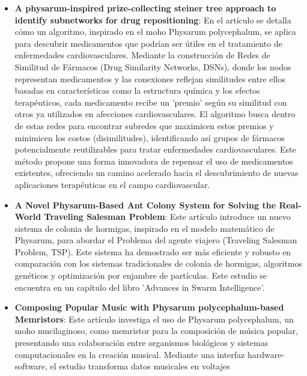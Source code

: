     \begin{itemize}
        \item \textbf{A physarum-inspired prize-collecting steiner tree approach to identify subnetworks for drug repositioning}:
            En el art\'iculo se detalla c\'omo un algoritmo, inspirado en el moho Physarum polycephalum, se aplica para descubrir medicamentos 
            que podr\'ian ser \'utiles en el tratamiento de enfermedades cardiovasculares. Mediante la construcci\'on de Redes de Similitud de F\'armacos 
            (Drug Similarity Networks, DSNs), donde los nodos representan medicamentos y las conexiones reflejan similitudes entre ellos basadas en caracter\'isticas como la 
            estructura qu\'imica y los efectos terap\'euticos, cada medicamento recibe un 'premio' seg\'un su similitud con otros ya utilizados en afecciones 
            cardiovasculares. El algoritmo busca dentro de estas redes para encontrar subredes que maximicen estos premios y minimicen los costos 
            (disimilitudes), identificando as\'i grupos de f\'armacos potencialmente reutilizables para tratar enfermedades cardiovasculares. 
            Este m\'etodo propone una forma innovadora de repensar el uso de medicamentos existentes, ofreciendo un camino acelerado hacia el 
            descubrimiento de nuevas aplicaciones terap\'euticas en el campo cardiovascular. \cite{Sun2016}
        \item \textbf{A Novel Physarum-Based Ant Colony System for Solving the Real-World Traveling Salesman Problem}:
            Este art\'iculo introduce un nuevo sistema de colonia de hormigas, inspirado en el modelo matem\'atico de Physarum, 
            para abordar el Problema del agente viajero (Traveling Salesman Problem, TSP). Este sistema ha demostrado ser m\'as eficiente y 
            robusto en comparaci\'on con los sistemas tradicionales de colonia de hormigas, algoritmos gen\'eticos y optimizaci\'on por 
            enjambre de part\'iculas. Este estudio se encuentra en un cap\'itulo del libro 'Advances in Swarm Intelligence'. \cite{Yuxiao2014} 
        \item \textbf{Composing Popular Music with Physarum polycephalum-based Memristors}: Este art\'iculo investiga el uso de Physarum polycephalum, 
            un moho mucilaginoso, como memristor para la composici\'on de m\'usica popular, presentando una colaboraci\'on entre organismos biol\'ogicos y 
            sistemas computacionales en la creaci\'on musical. Mediante una interfaz hardware-software, el estudio transforma datos musicales en voltajes 

\end{itemize}
